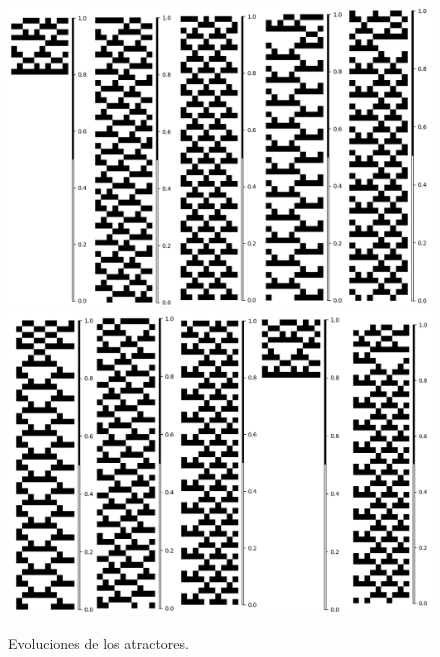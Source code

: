 \documentclass[11pt]{article}
\begin{document}
			\begin{figure}[H]
			\centering
			\includegraphics[scale=0.3]{resources/Atractores54/atractor_54_size_10_res.png}
			\includegraphics[scale=0.3]{resources/Atractores54/atractor_54_size_10_res1.png}
			\caption{Evoluciones de los atractores.}\label{fig:picture}
			\end{figure}
\end{document}

